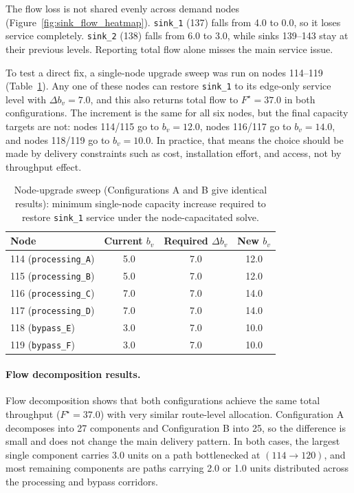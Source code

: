 \documentclass[12pt]{report}
\begin{document}
The flow loss is not shared evenly across demand nodes (Figure~\ref{fig:sink_flow_heatmap}). \texttt{sink\_1} (137) falls from 4.0 to 0.0, so it loses service completely. \texttt{sink\_2} (138) falls from 6.0 to 3.0, while sinks 139--143 stay at their previous levels. Reporting total flow alone misses the main service issue.

To test a direct fix, a single-node upgrade sweep was run on nodes 114--119 (Table~\ref{tab:node_upgrade_sweep}). Any one of these nodes can restore \texttt{sink\_1} to its edge-only service level with $\Delta b_v=7.0$, and this also returns total flow to $F^\star=37.0$ in both configurations. The increment is the same for all six nodes, but the final capacity targets are not: nodes 114/115 go to $b_v=12.0$, nodes 116/117 go to $b_v=14.0$, and nodes 118/119 go to $b_v=10.0$. In practice, that means the choice should be made by delivery constraints such as cost, installation effort, and access, not by throughput effect.

\begin{table}[htbp]
\centering
\caption{Node-upgrade sweep (Configurations A and B give identical results): minimum single-node capacity increase required to restore \texttt{sink\_1} service under the node-capacitated solve.}
\label{tab:node_upgrade_sweep}
\begin{tabular}{lccc}
\toprule
Node & Current $b_v$ & Required $\Delta b_v$ & New $b_v$ \\
\midrule
114 (\texttt{processing\_A}) & 5.0 & 7.0 & 12.0 \\
115 (\texttt{processing\_B}) & 5.0 & 7.0 & 12.0 \\
116 (\texttt{processing\_C}) & 7.0 & 7.0 & 14.0 \\
117 (\texttt{processing\_D}) & 7.0 & 7.0 & 14.0 \\
118 (\texttt{bypass\_E})     & 3.0 & 7.0 & 10.0 \\
119 (\texttt{bypass\_F})     & 3.0 & 7.0 & 10.0 \\
\bottomrule
\end{tabular}
\end{table}

\paragraph{Flow decomposition results.}

Flow decomposition shows that both configurations achieve the same total throughput ($F^\star=37.0$) with very similar route-level allocation. Configuration A decomposes into 27 components and Configuration B into 25, so the difference is small and does not change the main delivery pattern. In both cases, the largest single component carries 3.0 units on a path bottlenecked at $(114\to120)$, and most remaining components are paths carrying 2.0 or 1.0 units distributed across the processing and bypass corridors.
\end{document}
